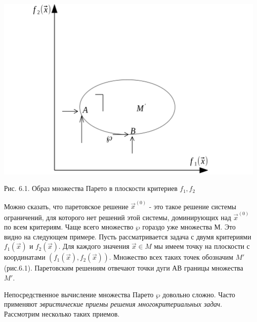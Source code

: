 {
\begin{center}
	\includegraphics[scale=0.8]{pictures/picturefile_6_1}

	Рис. 6.1. Образ множества Парето в плоскости критериев $f_{1}, f_{2}$
\end{center}

Можно сказать, что паретовское решение $\vec{x}^{(0)}$ - это такое решение системы ограничений, для которого нет решений этой системы, доминирующих над $\vec{x}^{(0)}$ по всем критериям. Чаще всего множество $\wp $ гораздо уже множества М. Это видно на следующем примере. Пусть рассматривается задача с двумя критериями $f_{1}(\vec{x})$ и $f_{2}(\vec{x})$. Для каждого значения $\vec{x} \in M$ мы имеем точку на плоскости с координатами $(f_{1}(\vec{x}), f_{2}(\vec{x}))$. Множество всех таких точек обозначим ${M}'$ (рис.6.1). Паретовским решениям отвечают точки дуги $АВ$ границы множества  ${M}'$.

Непосредственное вычисление множества Парето $\wp $  довольно сложно. Часто применяют \textit{эвристические приемы решения многокритериальных задач}. Рассмотрим несколько таких приемов.

}
